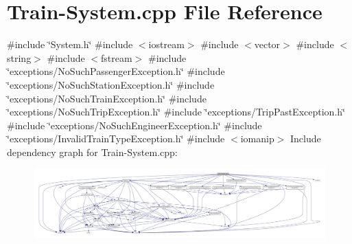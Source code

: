 \hypertarget{Train-System_8cpp}{}\section{Train-\/\+System.cpp File Reference}
\label{Train-System_8cpp}
{\ttfamily \#include \char`\"{}System.\+h\char`\"{}}\newline
{\ttfamily \#include $<$iostream$>$}\newline
{\ttfamily \#include $<$vector$>$}\newline
{\ttfamily \#include $<$string$>$}\newline
{\ttfamily \#include $<$fstream$>$}\newline
{\ttfamily \#include \char`\"{}exceptions/\+No\+Such\+Passenger\+Exception.\+h\char`\"{}}\newline
{\ttfamily \#include \char`\"{}exceptions/\+No\+Such\+Station\+Exception.\+h\char`\"{}}\newline
{\ttfamily \#include \char`\"{}exceptions/\+No\+Such\+Train\+Exception.\+h\char`\"{}}\newline
{\ttfamily \#include \char`\"{}exceptions/\+No\+Such\+Trip\+Exception.\+h\char`\"{}}\newline
{\ttfamily \#include \char`\"{}exceptions/\+Trip\+Past\+Exception.\+h\char`\"{}}\newline
{\ttfamily \#include \char`\"{}exceptions/\+No\+Such\+Engineer\+Exception.\+h\char`\"{}}\newline
{\ttfamily \#include \char`\"{}exceptions/\+Invalid\+Train\+Type\+Exception.\+h\char`\"{}}\newline
{\ttfamily \#include $<$iomanip$>$}\newline
Include dependency graph for Train-\/\+System.cpp\+:
\nopagebreak
\begin{figure}[H]
\begin{center}
\leavevmode
\includegraphics[width=350pt]{Train-System_8cpp__incl}
\end{center}
\end{figure}
